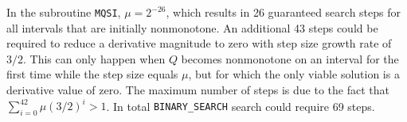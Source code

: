 

In the subroutine {\tt MQSI}, $\mu = 2^{-26}$, which results in 26
guaranteed search steps for all intervals that are initially
nonmonotone. An additional 43 steps could be required to reduce a
derivative magnitude to zero with step size growth rate of $3/2$. This
can only happen when $Q$ becomes nonmonotone on an interval for the
first time while the step size equals $\mu$, but for which the only
viable solution is a derivative value of zero. The maximum number of
steps is due to the fact that $\sum_{i=0}^{42} \mu (3/2)^i > 1$. In
total {\tt BINARY\_SEARCH} search could require 69 steps.
